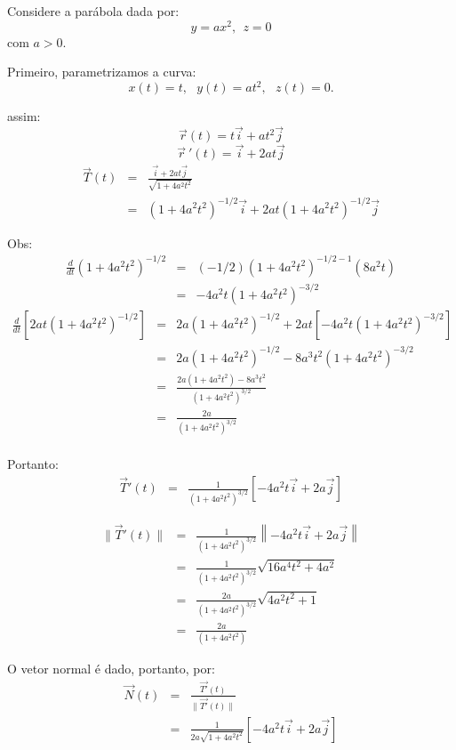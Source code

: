 \documentclass[a4paper,10pt]{article}
\begin{document}
 Considere a parábola dada por:
 $$y = ax^2, ~~z=0$$
 com $a>0$.

 Primeiro, parametrizamos a curva:
 $$x(t)=t,~~~ y(t)=at^2,~~~ z(t)=0.$$
 
 assim:
 $$\vec{r}(t)=t\vec{i}+at^2\vec{j}$$
 $$\vec{r}~\!'(t)=\vec{i}+2at\vec{j}$$
\begin{eqnarray*}
\vec{T}(t)&=&\frac{\vec{i}+2at\vec{j}}{\sqrt{1+4a^2t^2}} \\
&=&\left(1+4a^2t^2\right)^{-1/2}\vec{i}+2at\left(1+4a^2t^2\right)^{-1/2}\vec{j}
\end{eqnarray*}

Obs:
\begin{eqnarray*}
\frac{d}{dt}\left(1+4a^2t^2\right)^{-1/2} &=& (-1/2)\left(1+4a^2t^2\right)^{-1/2-1}(8a^2t)\\
 &=&-4a^2t\left(1+4a^2t^2\right)^{-3/2}
\end{eqnarray*}
\begin{eqnarray*}
\frac{d}{dt}\left[2at\left(1+4a^2t^2\right)^{-1/2}\right] &=& 
2a\left(1+4a^2t^2\right)^{-1/2}+2at\left[-4a^2t\left(1+4a^2t^2\right)^{-3/2}\right]\\
&=& 
2a\left(1+4a^2t^2\right)^{-1/2}-8a^3t^2\left(1+4a^2t^2\right)^{-3/2}\\
&=&\frac{2a(1+4a^2t^2)-8a^3t^2}{(1+4a^2t^2)^{3/2}}\\
&=&\frac{2a}{(1+4a^2t^2)^{3/2}}\\
\end{eqnarray*}

Portanto:
\begin{eqnarray*}
\vec{T}'(t)&=&\frac{1}{(1+4a^2t^2)^{3/2}}\left[-4a^2t\vec{i}+2a\vec{j}\right]
\end{eqnarray*}

\begin{eqnarray*}
\|\vec{T}'(t)\|&=&\frac{1}{(1+4a^2t^2)^{3/2}}\left\|-4a^2t\vec{i}+2a\vec{j}\right\|\\
&=&\frac{1}{(1+4a^2t^2)^{3/2}}\sqrt{16a^4t^2+4a^2}\\
&=&\frac{2a}{(1+4a^2t^2)^{3/2}}\sqrt{4a^2t^2+1}\\
&=&\frac{2a}{(1+4a^2t^2)}
\end{eqnarray*}

O vetor normal é dado, portanto, por:
\begin{eqnarray*}
\vec{N}(t)&=&\frac{\vec{T'}(t)}{\|\vec{T'}(t)\|}\\
&=&\frac{1}{2a\sqrt{1+4a^2t^2}}\left[-4a^2t\vec{i}+2a\vec{j}\right]
\end{eqnarray*}
\end{document}
